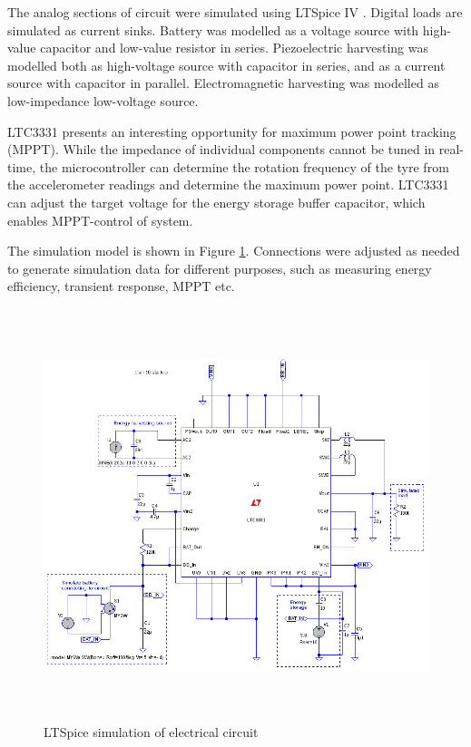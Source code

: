 The analog sections of circuit were simulated using LTSpice IV \cite{ltspice}. Digital loads are simulated as current sinks. Battery was modelled as a voltage source with high-value capacitor and low-value resistor in series. Piezoelectric harvesting was modelled both as high-voltage source with capacitor in series, and as a current source with capacitor in parallel. Electromagnetic harvesting was modelled as low-impedance low-voltage source. 

LTC3331 presents an interesting opportunity for maximum power point tracking (MPPT). While the impedance of individual components cannot be tuned in real-time, the microcontroller can determine the rotation frequency of the tyre from the accelerometer readings and determine the maximum power point. LTC3331 can adjust the target voltage for the energy storage buffer capacitor, which enables MPPT-control of system.

The simulation model is shown in Figure \ref{fig:ltspice_sim}. Connections were adjusted as needed to generate simulation data for different purposes, such as measuring energy efficiency, transient response, MPPT etc.

\begin{figure}[htb]
\begin{center}
\includegraphics[height=12cm]{images/own_dwg/ltspice_ltc3331.jpg}
\end{center}
\caption{\label{fig:ltspice_sim} LTSpice \cite{ltspice} simulation of electrical circuit}
\end{figure}

